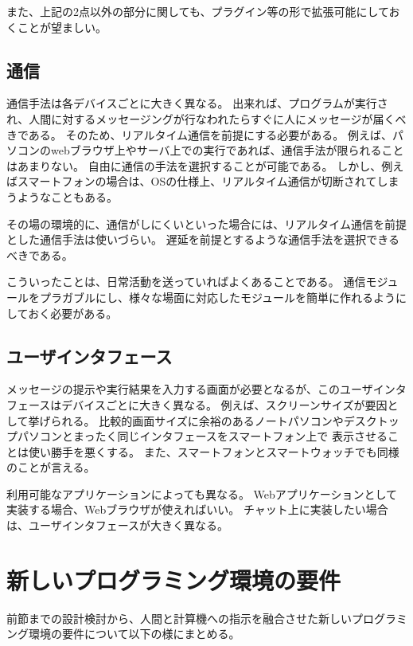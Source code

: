 また、上記の2点以外の部分に関しても、プラグイン等の形で拡張可能にしておくことが望ましい。

\subsection{通信}\label{ux901aux4fe1}

通信手法は各デバイスごとに大きく異なる。
出来れば、プログラムが実行され、人間に対するメッセージングが行なわれたらすぐに人にメッセージが届くべきである。
そのため、リアルタイム通信を前提にする必要がある。
例えば、パソコンのwebブラウザ上やサーバ上での実行であれば、通信手法が限られることはあまりない。
自由に通信の手法を選択することが可能である。
しかし、例えばスマートフォンの場合は、OSの仕様上、リアルタイム通信が切断されてしまうようなこともある。

その場の環境的に、通信がしにくいといった場合には、リアルタイム通信を前提とした通信手法は使いづらい。
遅延を前提とするような通信手法を選択できるべきである。

こういったことは、日常活動を送っていればよくあることである。
通信モジュールをプラガブルにし、様々な場面に対応したモジュールを簡単に作れるようにしておく必要がある。

\subsection{ユーザインタフェース}\label{ux30e6ux30fcux30b6ux30a4ux30f3ux30bfux30d5ux30a7ux30fcux30b9}

メッセージの提示や実行結果を入力する画面が必要となるが、このユーザインタフェースはデバイスごとに大きく異なる。
例えば、スクリーンサイズが要因として挙げられる。
比較的画面サイズに余裕のあるノートパソコンやデスクトップパソコンとまったく同じインタフェースをスマートフォン上で
表示させることは使い勝手を悪くする。
また、スマートフォンとスマートウォッチでも同様のことが言える。

利用可能なアプリケーションによっても異なる。
Webアプリケーションとして実装する場合、Webブラウザが使えればいい。
チャット上に実装したい場合は、ユーザインタフェースが大きく異なる。

\section{新しいプログラミング環境の要件}\label{ux65b0ux3057ux3044ux30d7ux30edux30b0ux30e9ux30dfux30f3ux30b0ux74b0ux5883ux306eux8981ux4ef6}

前節までの設計検討から、人間と計算機への指示を融合させた新しいプログラミング環境の要件について以下の様にまとめる。

